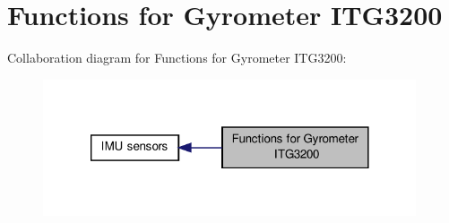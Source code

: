 \hypertarget{group__gyr}{\section{Functions for Gyrometer I\-T\-G3200}
\label{group__gyr}
}
Collaboration diagram for Functions for Gyrometer I\-T\-G3200\-:\nopagebreak
\begin{figure}[H]
\begin{center}
\leavevmode
\includegraphics[width=312pt]{group__gyr}
\end{center}
\end{figure}
